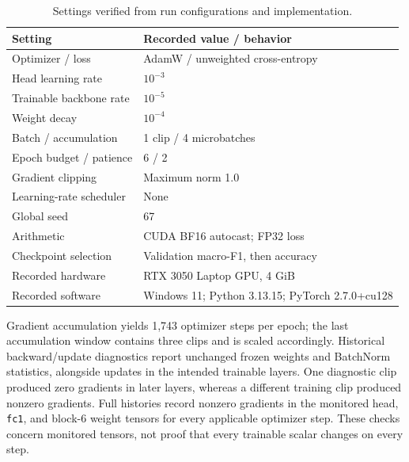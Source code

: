 \documentclass[conference]{IEEEtran}
\newcommand{\code}[1]{\texttt{#1}}
\begin{document}
\begin{table}[t]
\centering\caption{Settings verified from run configurations and implementation.}\label{tab:settings}
\footnotesize
\begin{tabular}{@{}p{}p{}@{}}\toprule
Setting & Recorded value / behavior\\\midrule
Optimizer / loss & AdamW / unweighted cross-entropy\\
Head learning rate & $10^{-3}$\\
Trainable backbone rate & $10^{-5}$\\
Weight decay & $10^{-4}$\\
Batch / accumulation & 1 clip / 4 microbatches\\
Epoch budget / patience & 6 / 2\\
Gradient clipping & Maximum norm 1.0\\
Learning-rate scheduler & None\\
Global seed & 67\\
Arithmetic & CUDA BF16 autocast; FP32 loss\\
Checkpoint selection & Validation macro-F1, then accuracy\\
Recorded hardware & RTX 3050 Laptop GPU, 4 GiB\\
Recorded software & Windows 11; Python 3.13.15; PyTorch 2.7.0+cu128\\\bottomrule
\end{tabular}
\end{table}

Gradient accumulation yields 1,743 optimizer steps per epoch; the last accumulation window contains three clips and is scaled accordingly. Historical backward/update diagnostics report unchanged frozen weights and BatchNorm statistics, alongside updates in the intended trainable layers. One diagnostic clip produced zero gradients in later layers, whereas a different training clip produced nonzero gradients. Full histories record nonzero gradients in the monitored head, \code{fc1}, and block-6 weight tensors for every applicable optimizer step. These checks concern monitored tensors, not proof that every trainable scalar changes on every step.
\end{document}
